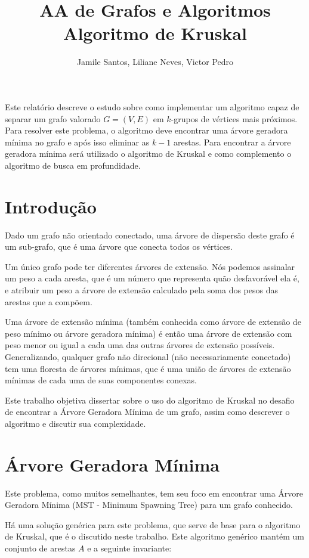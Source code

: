 \documentclass[12pt]{article}
\title{AA de Grafos e Algoritmos \\ Algoritmo de Kruskal}
\author{ Jamile Santos\inst{1}, Liliane Neves\inst{1}, Victor Pedro\inst{1} }
\begin{document}
	\maketitle

\begin{resumo}
	Este relatório descreve o estudo sobre como implementar um algoritmo capaz de separar um grafo valorado $G=(V,E)$ em $k$-grupos de vértices mais próximos. Para resolver este problema, o algoritmo deve encontrar uma árvore geradora mínima no grafo e após isso eliminar as $k-1$ arestas. Para encontrar a árvore geradora mínima será utilizado o algoritmo de Kruskal e como complemento o algoritmo de busca em profundidade.
\end{resumo}

\section{Introdução}
	Dado um grafo não orientado conectado, uma árvore de dispersão deste grafo é um sub-grafo, que é uma árvore que conecta todos os vértices. 
	
	Um único grafo pode ter diferentes árvores de extensão. Nós podemos assinalar um peso a cada aresta, que é um número que representa quão desfavorável ela é, e atribuir um peso a árvore de extensão calculado pela soma dos pesos das arestas que a compõem.
	
	Uma árvore de extensão mínima (também conhecida como árvore de extensão de peso mínimo ou árvore geradora mínima) é então uma árvore de extensão com peso menor ou igual a cada uma das outras árvores de extensão possíveis. Generalizando, qualquer grafo não direcional (não necessariamente conectado) tem uma floresta de árvores mínimas, que é uma união de árvores de extensão mínimas de cada uma de suas componentes conexas.
	
	Este trabalho objetiva dissertar sobre o uso do algoritmo de Kruskal no desafio de encontrar a Árvore Geradora Mínima de um grafo, assim como descrever o algoritmo e discutir sua complexidade.
	
\section{Árvore Geradora Mínima}
	Este problema, como muitos semelhantes, tem seu foco em encontrar uma Árvore Geradora Mínima (MST - Minimum Spawning Tree)  para um grafo conhecido.
	
	Há uma solução genérica para este problema, que serve de base para o algoritmo de Kruskal, que é o discutido neste trabalho. Este algoritmo genérico mantém um conjunto de arestas $A$ e a seguinte invariante:
	
\end{document}

